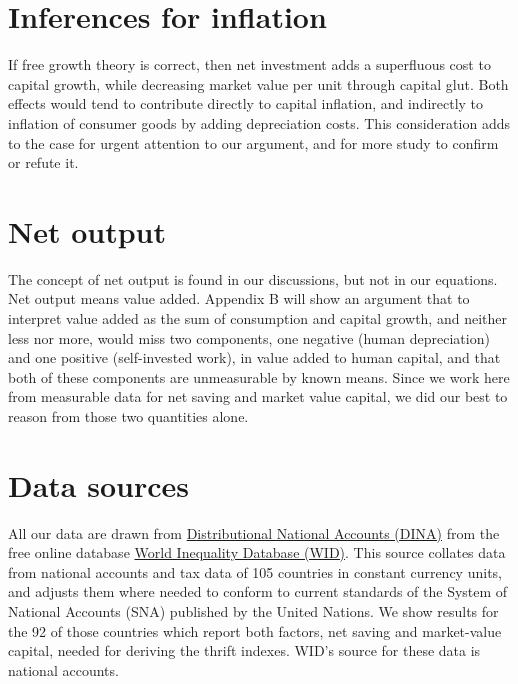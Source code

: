 \documentclass[a4paper,fleqn]{latex_styles/cas-sc}
\begin{document}
\section{Inferences for inflation}

If free growth theory is correct, then net investment adds a superfluous cost to capital growth, while decreasing market value per unit through capital glut. Both effects would tend to contribute directly to capital inflation, and indirectly to inflation of consumer goods by adding depreciation costs. This consideration adds to the case for urgent attention to our argument, and for more study to confirm or refute it.

\hypertarget{net-output}{
\section{Net output}\label{net-output}
}
The concept of net output is found in our discussions, but not in our equations. Net output means value added. Appendix B will show an argument that to interpret value added as the sum of consumption and capital growth, and neither less nor more, would miss two components, one negative (human depreciation) and one positive (self-invested work), in value added to human capital, and that both of these components are unmeasurable by known means. Since we work here from measurable data for net saving and market value capital, we did our best to reason from those two quantities alone.
%



\hypertarget{data-sources}{%
\section{Data sources}\label{data-sources}}

All our data are drawn from \href{https://wid.world/document/distributional-national-accounts-guidelines-2020-concepts-and-methods-used-in-the-world-inequality-database/}{Distributional National Accounts (DINA)} from the free online database \href{wid.world.com}{World
Inequality Database (WID)}. This source collates data from national accounts and tax data
of 105 countries in constant currency units, and adjusts them where needed to conform to current standards of the System of National Accounts
(SNA) published by the United Nations. We show results for the 92 of
those countries which report both factors, net
saving and market-value capital, needed for deriving
the thrift indexes. WID's source for these data is national accounts.
\end{document}
